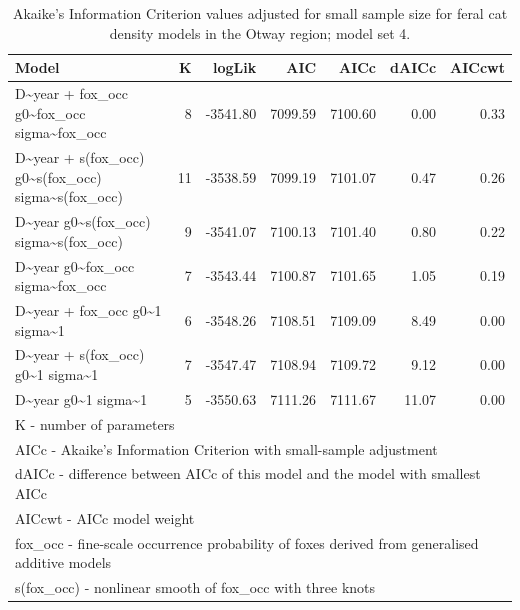 \documentclass[preprint, 3p, authoryear]{elsarticle} %
\begin{document}
\begin{longtable}[t]{lrrrrrr}
\caption{\label{tab:density-aic-o-3}Akaike's Information Criterion values adjusted for small sample size for feral cat density models in the Otway region; model set 4.}\\
\toprule
Model & K & logLik & AIC & AICc & dAICc & AICcwt\\
\midrule
D\textasciitilde{}year + fox\_occ g0\textasciitilde{}fox\_occ sigma\textasciitilde{}fox\_occ & 8 & -3541.80 & 7099.59 & 7100.60 & 0.00 & 0.33\\
D\textasciitilde{}year + s(fox\_occ) g0\textasciitilde{}s(fox\_occ) sigma\textasciitilde{}s(fox\_occ) & 11 & -3538.59 & 7099.19 & 7101.07 & 0.47 & 0.26\\
D\textasciitilde{}year g0\textasciitilde{}s(fox\_occ) sigma\textasciitilde{}s(fox\_occ) & 9 & -3541.07 & 7100.13 & 7101.40 & 0.80 & 0.22\\
D\textasciitilde{}year g0\textasciitilde{}fox\_occ sigma\textasciitilde{}fox\_occ & 7 & -3543.44 & 7100.87 & 7101.65 & 1.05 & 0.19\\
D\textasciitilde{}year + fox\_occ g0\textasciitilde{}1 sigma\textasciitilde{}1 & 6 & -3548.26 & 7108.51 & 7109.09 & 8.49 & 0.00\\
\addlinespace
D\textasciitilde{}year + s(fox\_occ) g0\textasciitilde{}1 sigma\textasciitilde{}1 & 7 & -3547.47 & 7108.94 & 7109.72 & 9.12 & 0.00\\
D\textasciitilde{}year g0\textasciitilde{}1 sigma\textasciitilde{}1 & 5 & -3550.63 & 7111.26 & 7111.67 & 11.07 & 0.00\\
\bottomrule
\multicolumn{7}{l}{\rule{0pt}{1em}K - number of parameters}\\
\multicolumn{7}{l}{\rule{0pt}{1em}AICc - Akaike's Information Criterion with small-sample adjustment}\\
\multicolumn{7}{l}{\rule{0pt}{1em}dAICc - difference between AICc of this model and the model with smallest AICc}\\
\multicolumn{7}{l}{\rule{0pt}{1em}AICcwt - AICc model weight}\\
\multicolumn{7}{l}{\rule{0pt}{1em}fox\_occ - fine-scale occurrence probability of foxes derived from generalised additive models}\\
\multicolumn{7}{l}{\rule{0pt}{1em}s(fox\_occ) - nonlinear smooth of fox\_occ with three knots}\\
\end{longtable}
\endgroup{}

\newpage
\end{document}
